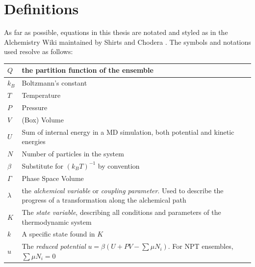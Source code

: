 \documentclass[oneside]{scrreprt}
\begin{document}
\section{Definitions}
As far as possible, equations in this thesis are notated and styled as in the Alchemistry Wiki maintained by Shirts and Chodera \cite{shirts_alchemistrywiki_nodate}. The symbols and notations used resolve as follows:
\begin{center}
    

\begin{tabular}{ | m{3cm} | m{10cm}| }
\hline
$Q$ & the partition function of the ensemble \\
\hline
$k_B$ & Boltzmann's constant\\
\hline
$T$ & Temperature \\
\hline
$P$ & Pressure \\
\hline
$V$ & (Box) Volume\\
\hline
$U$ & Sum of internal energy in a MD simulation, both potential and kinetic energies\\
\hline
$N$ & Number of particles in the system\\
\hline
$\beta$ & Substitute for $(k_B T)^{-1}$ by convention \\
\hline
$\Gamma$ & Phase Space Volume \\
\hline
$\lambda$ & the \emph{alchemical variable} or \emph{coupling parameter}. Used to describe the progress of a transformation along the alchemical path\\
\hline
$K$ & The \emph{state variable}, describing all conditions and parameters of the thermodynamic system\\
\hline
$k$ & A specific state found in $K$\\
\hline
$u$ & The \emph{reduced potential} $u=\beta(U+PV-\sum{\mu N_i}) $. For NPT ensembles, $\sum{\mu N_i} = 0$\\
\hline
\end{tabular}
\end{center}
\listoffigures

\listoftables

\printbibliography[title={References}]%
\end{document}
